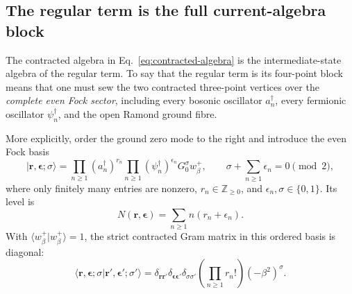 \documentclass[11pt]{article}
\begin{document}
\subsection{The regular term is the full current-algebra block}

The contracted algebra in Eq.~\eqref{eq:contracted-algebra} is the
intermediate-state algebra of the regular term.  To say that the
regular term is its four-point block means that one must sew the two
contracted three-point vertices over the \emph{complete even Fock sector},
including every bosonic oscillator \(a_n^\dagger\), every fermionic
oscillator \(\psi_n^\dagger\), and the open Ramond ground fibre.

More explicitly, order the ground zero mode to the right and introduce
the even Fock basis
\begin{equation}
 |\bm r,\bm\epsilon;\sigma\rangle
 =
 \prod_{n\geq1}(a_n^\dagger)^{r_n}
 \prod_{n\geq1}(\psi_n^\dagger)^{\epsilon_n}
 G_0^\sigma w_\beta^+,
 \qquad
 \sigma+\sum_{n\geq1}\epsilon_n=0\pmod2,
 \label{eq:contracted-fock-basis}
\end{equation}
where only finitely many entries are nonzero,
\(r_n\in\mathbb Z_{\geq0}\), and
\(\epsilon_n,\sigma\in\{0,1\}\).  Its level is
\begin{equation}
 N(\bm r,\bm\epsilon)
 =\sum_{n\geq1}n(r_n+\epsilon_n).
 \label{eq:contracted-level}
\end{equation}
With \(\langle w_\beta^+|w_\beta^+\rangle=1\), the strict contracted Gram
matrix in this ordered basis is diagonal:
\begin{equation}
 \langle\bm r,\bm\epsilon;\sigma
 |\bm r',\bm\epsilon';\sigma'\rangle
 =
 \delta_{\bm r\bm r'}\delta_{\bm\epsilon\bm\epsilon'}
 \delta_{\sigma\sigma'}
 \left(\prod_{n\geq1}r_n!\right)(-\beta^2)^\sigma.
 \label{eq:contracted-gram}
\end{equation}
\end{document}

